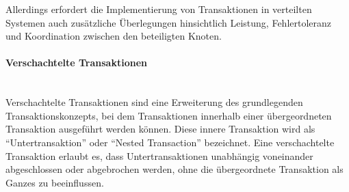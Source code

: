 \documentclass[../vs-script-first-v01.tex]{subfiles}
\begin{document}
Allerdings erfordert die Implementierung von Transaktionen in verteilten Systemen auch zusätzliche Überlegungen hinsichtlich Leistung, Fehlertoleranz und Koordination zwischen den beteiligten Knoten.
\paragraph{Verschachtelte Transaktionen}\mbox{}\\
Verschachtelte Transaktionen sind eine Erweiterung des grundlegenden Transaktionskonzepts, bei dem Transaktionen innerhalb einer übergeordneten Transaktion ausgeführt werden können. Diese innere Transaktion wird als \enquote{Untertransaktion} oder \enquote{Nested Transaction} bezeichnet. Eine verschachtelte Transaktion erlaubt es, dass Untertransaktionen unabhängig voneinander abgeschlossen oder abgebrochen werden, ohne die übergeordnete Transaktion als Ganzes zu beeinflussen.
\end{document}
